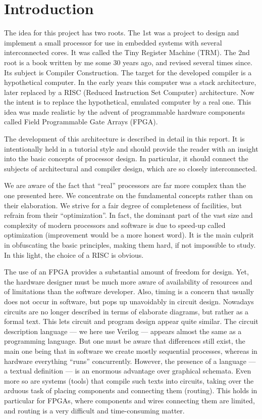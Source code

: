 \setcounter{section}{-1}
\section{Introduction}
\label{ch:intro}
The idea for this project has two roots. The 1st was a project to design and implement a small
processor for use in embedded systems with several interconnected cores. It was called the Tiny
Register Machine (TRM). The 2nd root is a book written by me some 30 years ago, and revised
several times since. Its subject is Compiler Construction. The target for the developed
compiler is a hypothetical computer. In the early years this computer was a stack architecture,
later replaced by a RISC (Reduced Instruction Set Computer) architecture. Now the intent is to
replace the hypothetical, emulated computer by a real one. This idea was made realistic by the
advent of programmable hardware components called Field Programmable Gate Arrays (FPGA).

The development of this architecture is described in detail in this report. It is intentionally held in a
tutorial style and should provide the reader with an insight into the basic concepts of processor
design. In particular, it should connect the subjects of architectural and compiler design, which are
so closely interconnected.

We are aware of the fact that “real” processors are far more complex than the one presented here.
We concentrate on the fundamental concepts rather than on their elaboration. We strive for a fair
degree of completeness of facilities, but refrain from their “optimization”. In fact, the dominant part of
the vast size and complexity of modern processors and software is due to speed-up called
optimization (improvement would be a more honest word). It is the main culprit in obfuscating the
basic principles, making them hard, if not impossible to study. In this light, the choice of a RISC
 is obvious.

The use of an FPGA provides a substantial amount of freedom for design. Yet, the hardware
designer must be much more aware of availability of resources and of limitations than the software
developer. Also, timing is a concern that usually does not occur in software, but pops up
unavoidably in circuit design. Nowadays circuits are no longer described in terms of elaborate
diagrams, but rather as a formal text. This lets circuit and program design appear quite similar. The
circuit description language — we here use Verilog — appears almost the same as a programming
language. But one must be aware that differences still exist, the main one being that in software we
create mostly sequential processes, whereas in hardware everything “runs” concurrently. However,
the presence of a language — a textual definition — is an enormous advantage over graphical
schemata. Even more so are systems (tools) that compile such texts into circuits, taking over the
arduous task of placing components and connecting them (routing). This holds in particular for
FPGAs, where components and wires connecting them are limited, and routing is a very difficult and
time-consuming matter.

